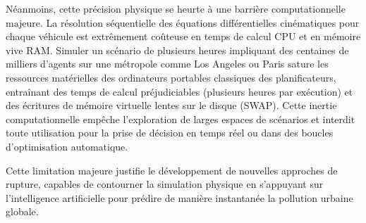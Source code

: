 \documentclass[10pt, a4paper]{article}
\begin{document}
Néanmoins, cette précision physique se heurte à une barrière
computationnelle majeure. La résolution séquentielle des équations
différentielles cinématiques pour chaque véhicule est extrêmement
coûteuse en temps de calcul CPU et en mémoire vive RAM. Simuler un
scénario de plusieurs heures impliquant des centaines de milliers
d'agents sur une métropole comme Los Angeles ou Paris sature les
ressources matérielles des ordinateurs portables classiques des
planificateurs, entraînant des temps de calcul préjudiciables (plusieurs
heures par exécution) et des écritures de mémoire virtuelle lentes sur
le disque (SWAP). Cette inertie computationnelle empêche l'exploration
de larges espaces de scénarios et interdit toute utilisation pour la
prise de décision en temps réel ou dans des boucles d'optimisation
automatique.

Cette limitation majeure justifie le développement de nouvelles
approches de rupture, capables de contourner la simulation physique en
s'appuyant sur l'intelligence artificielle pour prédire de manière
instantanée la pollution urbaine globale.
\end{document}
